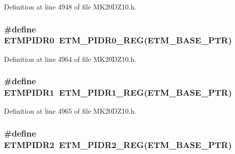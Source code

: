 Definition at line 4948 of file M\+K20\+D\+Z10.\+h.

\subsubsection[{\texorpdfstring{E\+T\+M\+P\+I\+D\+R0}{ETMPIDR0}}]{\setlength{\rightskip}{0pt plus 5cm}\#define E\+T\+M\+P\+I\+D\+R0~{\bf E\+T\+M\+\_\+\+P\+I\+D\+R0\+\_\+\+R\+EG}({\bf E\+T\+M\+\_\+\+B\+A\+S\+E\+\_\+\+P\+TR})}\hypertarget{group___e_t_m___register___accessor___macros_ga8b7c55cb9ed32cc27e82ef332717f80d}{}\label{group___e_t_m___register___accessor___macros_ga8b7c55cb9ed32cc27e82ef332717f80d}


Definition at line 4964 of file M\+K20\+D\+Z10.\+h.

\subsubsection[{\texorpdfstring{E\+T\+M\+P\+I\+D\+R1}{ETMPIDR1}}]{\setlength{\rightskip}{0pt plus 5cm}\#define E\+T\+M\+P\+I\+D\+R1~{\bf E\+T\+M\+\_\+\+P\+I\+D\+R1\+\_\+\+R\+EG}({\bf E\+T\+M\+\_\+\+B\+A\+S\+E\+\_\+\+P\+TR})}\hypertarget{group___e_t_m___register___accessor___macros_ga71ac5d10d1034e429bf908babfa9ae54}{}\label{group___e_t_m___register___accessor___macros_ga71ac5d10d1034e429bf908babfa9ae54}


Definition at line 4965 of file M\+K20\+D\+Z10.\+h.

\subsubsection[{\texorpdfstring{E\+T\+M\+P\+I\+D\+R2}{ETMPIDR2}}]{\setlength{\rightskip}{0pt plus 5cm}\#define E\+T\+M\+P\+I\+D\+R2~{\bf E\+T\+M\+\_\+\+P\+I\+D\+R2\+\_\+\+R\+EG}({\bf E\+T\+M\+\_\+\+B\+A\+S\+E\+\_\+\+P\+TR})}\hypertarget{group___e_t_m___register___accessor___macros_gaba6ace87f20b8efd45a7eb7fef547673}{}\label{group___e_t_m___register___accessor___macros_gaba6ace87f20b8efd45a7eb7fef547673}


